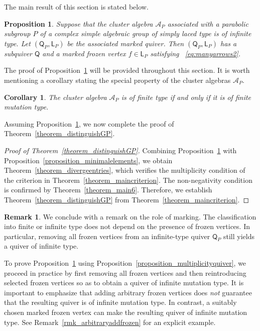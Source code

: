 \documentclass[11pt]{amsart}
\def\mcal{\mathcal}
\numberwithin{equation}{section}
\theoremstyle{plain}
\newtheorem{proposition}[theorem]{Proposition}
\newtheorem{corollary}[theorem]{Corollary}
\theoremstyle{definition}
\newtheorem{remark}[theorem]{Remark}
\numberwithin{equation}{section}
\begin{document}
The main result of this section is stated below.

\begin{proposition}\label{prop_mainsection7}
Suppose that the cluster algebra $\mcal{A}_P$ associated with a parabolic subgroup $P$ of a complex simple algebraic group of simply laced type is of infinite type. Let $(\mathsf{Q}_P,\mathsf{L}_P)$ be the associated marked quiver. Then $(\mathsf{Q}_P,\mathsf{L}_P)$ has a subquiver $\mathsf{Q}$ and a marked frozen vertex $f \in \mathsf{L}_P$ satisfying ~\eqref{eq:manyarrows2}.
\end{proposition}

The proof of Proposition~\ref{prop_mainsection7} will be provided throughout this section. It is worth mentioning a corollary stating the special property of the cluster algebras $\mathcal{A}_P$.

\begin{corollary}
The cluster algebra $\mcal{A}_P$ is of finite type if and only if it is of finite mutation type. 
\end{corollary}

Assuming Proposition~\ref{prop_mainsection7}, we now complete the proof of Theorem~\ref{theorem_distinguishGP}.

\begin{proof}[Proof of Theorem~\ref{theorem_distinguishGP}]
Combining Proposition~\ref{prop_mainsection7} with Proposition~\ref{proposition_minimalelements}, we obtain Theorem~\ref{theorem_divergeentries}, which verifies the multiplicity condition of the criterion in Theorem~\ref{theorem_maincriterion}. The non-negativity condition is confirmed by Theorem~\ref{theorem_main6}. Therefore, we establish Theorem~\ref{theorem_distinguishGP} from  Theorem~\ref{theorem_maincriterion}.
\end{proof}


\begin{remark}
We conclude with a remark on the role of marking. The classification into finite or infinite type does not depend on the presence of frozen vertices. In particular, removing all frozen vertices from an infinite-type quiver $\mathsf{Q}_P$ still yields a quiver of infinite type. 

To prove Proposition~\ref{prop_mainsection7} using Proposition~\ref{proposition_multiplicityquiver}, we proceed in practice by first removing all frozen vertices and then reintroducing selected frozen vertices so as to obtain a quiver of infinite mutation type. It is important to emphasize that adding arbitrary frozen vertices does \emph{not} guarantee that the resulting quiver is of infinite mutation type. In contrast, a suitably chosen marked frozen vertex can  make the resulting quiver of infinite mutation type. See Remark~\ref{rmk_arbitraryaddfrozen} for an explicit example. 
\end{remark}
\end{document}
